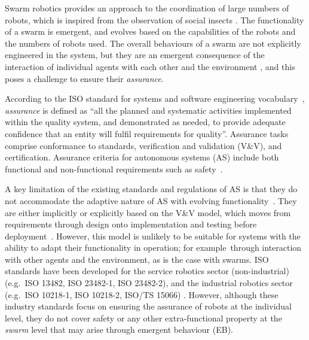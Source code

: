 \documentclass[runningheads]{llncs}
\begin{document}
Swarm robotics provides an approach to the coordination of large numbers of robots, which is inspired from the observation of social insects \cite{Sahin2005}. 
The functionality of a swarm is emergent, and evolves based on the capabilities of the robots and the numbers of robots used. 
The overall behaviours of a swarm are not explicitly engineered in the system, but they are an emergent consequence of the interaction of individual agents with each other and the environment \cite{Abeywickrama2022}, and this poses a challenge to ensure their \emph{assurance}. 

According to the ISO standard for systems and software engineering vocabulary~\cite{ISO24765:2017}, \emph{assurance} is defined as ``all the planned and systematic activities implemented within the quality system, and demonstrated as needed, to provide adequate confidence that an entity will fulfil requirements for quality''. 
Assurance tasks comprise conformance to standards, verification and validation (V\&V), and certification. Assurance criteria for autonomous systems (AS) include both functional and non-functional requirements such as safety~\cite{Cheng2014}. 

A key limitation of the existing standards and regulations of AS is that they do not accommodate the adaptive nature of AS with evolving functionality~\cite{Fisher2020}. 
They are either implicitly or explicitly based on the V\&V model, which moves from requirements through design onto implementation and testing before deployment~\cite{Jia2021}. 
However, this model is unlikely to be suitable for systems with the ability to adapt their functionality in operation; for example\ through interaction with other agents and the environment, as is the case with swarms. 
ISO standards have been developed for the service robotics sector (non-industrial) (e.g.\ ISO 13482, ISO 23482-1, ISO 23482-2), and the industrial robotics sector (e.g.\ ISO 10218-1, ISO 10218-2, ISO/TS 15066) \cite{Abeywickrama2022}. 
However, although these industry standards focus on ensuring the assurance of robots at the individual level, they do not cover safety or any other extra-functional property at the \emph{swarm} level that may arise through emergent behaviour (EB). %
\end{document}
